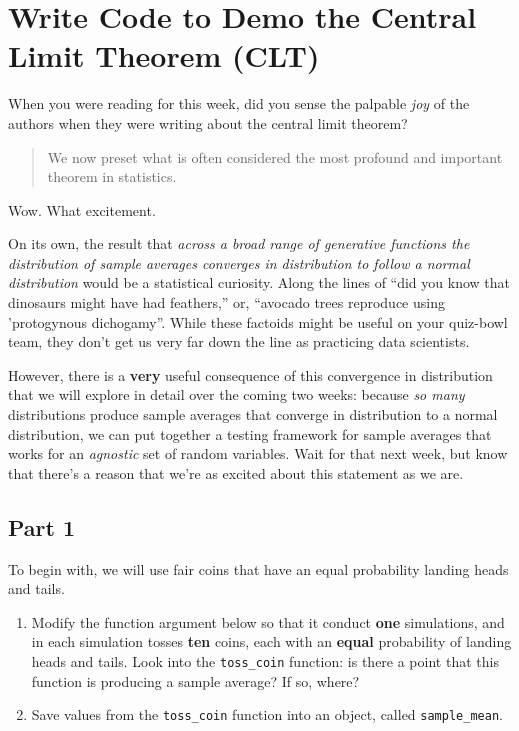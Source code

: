 \documentclass[
]{book}
\providecommand{\tightlist}{%
  \setlength{\itemsep}{0pt}\setlength{\parskip}{0pt}}
\theoremstyle{definition}
\theoremstyle{definition}
\theoremstyle{definition}
\theoremstyle{definition}
\theoremstyle{remark}
\begin{document}
\hypertarget{write-code-to-demo-the-central-limit-theorem-clt}{%
\section{Write Code to Demo the Central Limit Theorem (CLT)}\label{write-code-to-demo-the-central-limit-theorem-clt}}

When you were reading for this week, did you sense the palpable \emph{joy} of the authors when they were writing about the central limit theorem?

\begin{quote}
We now preset what is often considered the most profound and important theorem in statistics.
\end{quote}

Wow. What excitement.

On its own, the result that \emph{across a broad range of generative functions the distribution of sample averages converges in distribution to follow a normal distribution} would be a statistical curiosity. Along the lines of ``did you know that dinosaurs might have had feathers,'' or, ``avocado trees reproduce using 'protogynous dichogamy''. While these factoids might be useful on your quiz-bowl team, they don't get us very far down the line as practicing data scientists.

However, there is a \textbf{very} useful consequence of this convergence in distribution that we will explore in detail over the coming two weeks: because \emph{so many} distributions produce sample averages that converge in distribution to a normal distribution, we can put together a testing framework for sample averages that works for an \emph{agnostic} set of random variables. Wait for that next week, but know that there's a reason that we're as excited about this statement as we are.

\hypertarget{part-1}{%
\subsection{Part 1}\label{part-1}}

To begin with, we will use fair coins that have an equal probability landing heads and tails.

\begin{enumerate}
\def\labelenumi{\arabic{enumi}.}
\tightlist
\item
  Modify the function argument below so that it conduct \textbf{one} simulations, and in each simulation tosses \textbf{ten} coins, each with an \textbf{equal} probability of landing heads and tails. Look into the \texttt{toss\_coin} function: is there a point that this function is producing a sample average? If so, where?
\item
  Save values from the \texttt{toss\_coin} function into an object, called \texttt{sample\_mean}.
\end{enumerate}
\end{document}
